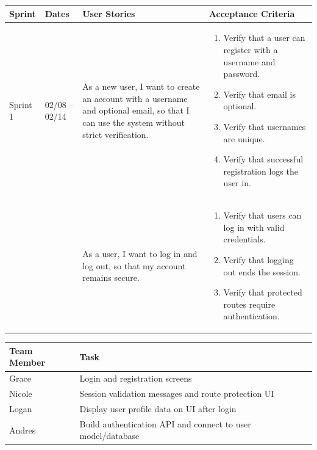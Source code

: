 \documentclass[11pt]{article}
\begin{document}
\noindent
\begin{tabular}{|L{1.2cm}|L{1.8cm}|L{5.2cm}|L{6.3cm}|}
\hline
\textbf{Sprint} & \textbf{Dates} & \textbf{User Stories} & \textbf{Acceptance Criteria} \\
\hline
Sprint 1 & 02/08 -- 02/14 &
As a new user, I want to create an account with a username and optional email, so that I can use the system without strict verification. &
\begin{enumerate}
    \item Verify that a user can register with a username and password.
    \item Verify that email is optional.
    \item Verify that usernames are unique.
    \item Verify that successful registration logs the user in.
\end{enumerate} \\
& &
As a user, I want to log in and log out, so that my account remains secure. &
\begin{enumerate}
    \item Verify that users can log in with valid credentials.
    \item Verify that logging out ends the session.
    \item Verify that protected routes require authentication.
\end{enumerate} \\
\hline
\end{tabular}

\vspace{0.5em}

\noindent
\begin{tabular}{|L{2.5cm}|L{12.5cm}|}
\hline
\textbf{Team Member} & \textbf{Task} \\
\hline
Grace & Login and registration screens \\
\hline
Nicole & Session validation messages and route protection UI \\
\hline
Logan & Display user profile data on UI after login \\
\hline
Andres & Build authentication API and connect to user model/database \\
\hline
\end{tabular}

\vspace{2em}

\end{document}
